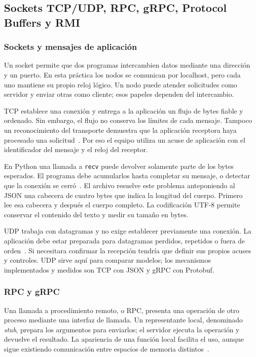 \subsection{Sockets TCP/UDP, RPC, gRPC, Protocol Buffers y RMI}
\label{sec:nixon-comunicacion}

\subsubsection{Sockets y mensajes de aplicación}
Un socket permite que dos programas intercambien datos mediante una dirección y
un puerto. En esta práctica los nodos se comunican por localhost, pero cada uno
mantiene su propio reloj lógico. Un nodo puede atender solicitudes como servidor
y enviar otras como cliente; esos papeles dependen del intercambio.

TCP establece una conexión y entrega a la aplicación un flujo de bytes fiable y
ordenado. Sin embargo, el flujo no conserva los límites de cada mensaje. Tampoco
un reconocimiento del transporte demuestra que la aplicación receptora haya
procesado una solicitud~\cite{belinda_eddy2022_tcp}. Por eso el equipo utiliza un
acuse de aplicación con el identificador del mensaje y el reloj del receptor.

En Python una llamada a \texttt{recv} puede devolver solamente parte de los bytes
esperados. El programa debe acumularlos hasta completar su mensaje, o detectar
que la conexión se cerró~\cite{nixon_python_sockets}. El archivo
 resuelve este problema anteponiendo al JSON una
cabecera de cuatro bytes que indica la longitud del cuerpo. Primero lee esa
cabecera y después el cuerpo completo. La codificación UTF-8 permite conservar
el contenido del texto y medir su tamaño en bytes.

UDP trabaja con datagramas y no exige establecer previamente una conexión.
La aplicación debe estar preparada para datagramas perdidos, repetidos o fuera
de orden~\cite{nixon_microsoft_udp}. Si necesitara confirmar la recepción tendría
que definir sus propios acuses y controles. UDP sirve aquí para comparar modelos;
los mecanismos implementados y medidos son TCP con JSON y gRPC con Protobuf.

\subsubsection{RPC y gRPC}
Una llamada a procedimiento remoto, o RPC, presenta una operación de otro proceso
mediante una interfaz de llamada. Un representante local, denominado \emph{stub},
prepara los argumentos para enviarlos; el servidor ejecuta la operación y devuelve
el resultado. La apariencia de una función local facilita el uso, aunque sigue
existiendo comunicación entre espacios de memoria distintos~\cite{nixon_oracle_rmi}.

